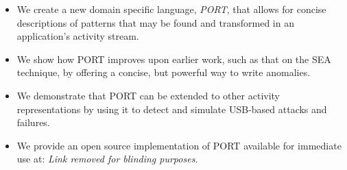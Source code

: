 \begin{itemize}

\item We create a new domain specific language, {\em PORT},
  that allows for concise descriptions of patterns
  that may be
  found and transformed in an application's activity stream.

\item We show how PORT improves upon earlier work, such as that on the SEA technique, by offering a concise, but powerful way to write anomalies.

\item We demonstrate that PORT can be extended to other activity representations by using it to detect and simulate USB-based attacks and failures.

\item We provide an open source implementation of PORT available for immediate use
at: \textit{Link removed for blinding purposes.}

\end{itemize}


